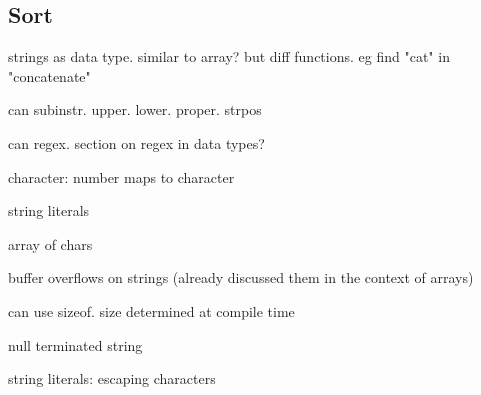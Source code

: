 
\subsection{Sort}

strings as data type. similar to array? but diff functions. eg find "cat" in "concatenate"

can subinstr. upper. lower. proper. strpos

can regex. section on regex in data types?

character: number maps to character


string literals

array of chars

buffer overflows on strings (already discussed them in the context of arrays)

can use sizeof. size determined at compile time

null terminated string

string literals: escaping characters

